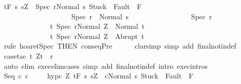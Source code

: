 \begin{isabellebody}
\ {\isachardoublequoteopen}{\isasymGamma}{\isacharcomma}{\isasymTheta}{\isasymturnstile}\isactrlsub t\isactrlbsub {\isacharslash}F\isactrlesub \ {\isacharbraceleft}s{\isachardot}\ s{\isacharequal}Z\ {\isasymand}\ {\isasymGamma}{\isasymturnstile}{\isasymlangle}Spec\ r{\isacharcomma}Normal\ s{\isasymrangle}\ {\isasymRightarrow}{\isasymnotin}{\isacharparenleft}{\isacharbraceleft}Stuck{\isacharbraceright}\ {\isasymunion}\ Fault\ {\isacharbackquote}\ {\isacharparenleft}{\isacharminus}F{\isacharparenright}{\isacharparenright}\ {\isasymand}\ \isanewline
\ \ \ \ \ \ \ \ \ \ \ \ \ \ \ \ \ \ \ \ {\isasymGamma}{\isasymturnstile}Spec\ r\ {\isasymdown}\ Normal\ s{\isacharbraceright}\ \isanewline
\ \ \ \ \ \ \ \ \ \ \ \ \ \ \ \ Spec\ r\isanewline
\ \ \ \ \ \ \ \ \ \ \ \ \ \ {\isacharbraceleft}t{\isachardot}\ {\isasymGamma}{\isasymturnstile}{\isasymlangle}Spec\ r{\isacharcomma}Normal\ Z{\isasymrangle}\ {\isasymRightarrow}\ Normal\ t{\isacharbraceright}{\isacharcomma}\isanewline
\ \ \ \ \ \ \ \ \ \ \ \ \ \ {\isacharbraceleft}t{\isachardot}\ {\isasymGamma}{\isasymturnstile}{\isasymlangle}Spec\ r{\isacharcomma}Normal\ Z{\isasymrangle}\ {\isasymRightarrow}\ Abrupt\ t{\isacharbraceright}{\isachardoublequoteclose}\isanewline
\ \ \ \ \isamarkupfalse%
\ {\isacharparenleft}rule\ hoaret{\isachardot}Spec\ {\isacharbrackleft}THEN\ conseqPre{\isacharbrackright}{\isacharparenright}\isanewline
\ \ \ \ \isamarkupfalse%
\ {\isacharparenleft}clarsimp\ simp\ add{\isacharcolon}\ final{\isacharunderscore}notin{\isacharunderscore}def{\isacharparenright}\isanewline
\ \ \ \ \isamarkupfalse%
\ {\isacharparenleft}case{\isacharunderscore}tac\ {\isachardoublequoteopen}{\isasymexists}t{\isachardot}\ {\isacharparenleft}Z{\isacharcomma}t{\isacharparenright}\ {\isasymin}\ r{\isachardoublequoteclose}{\isacharparenright}\isanewline
\ \ \ \ \isamarkupfalse%
\ {\isacharparenleft}auto\ elim{\isacharcolon}\ exec{\isacharunderscore}elim{\isacharunderscore}cases\ simp\ add{\isacharcolon}\ final{\isacharunderscore}notin{\isacharunderscore}def\ intro{\isacharcolon}\ exec{\isachardot}intros{\isacharparenright}\isanewline
\ \ \ \ \isamarkupfalse%
\isanewline
{}\isamarkupfalse%
\isanewline
\ \ \isamarkupfalse%
\ {\isacharparenleft}Seq\ c{}\ c{}{\isacharparenright}\ \isanewline
\ \ \isamarkupfalse%
\ hyp{\isacharunderscore}c{}{\isacharcolon}\ {\isachardoublequoteopen}{\isasymforall}Z{\isachardot}\ {\isasymGamma}{\isacharcomma}{\isasymTheta}{\isasymturnstile}\isactrlsub t\isactrlbsub {\isacharslash}F\isactrlesub \ {\isacharbraceleft}s{\isachardot}\ s{\isacharequal}Z\ {\isasymand}\ {\isasymGamma}{\isasymturnstile}{\isasymlangle}c{}{\isacharcomma}Normal\ s{\isasymrangle}\ {\isasymRightarrow}{\isasymnotin}{\isacharparenleft}{\isacharbraceleft}Stuck{\isacharbraceright}\ {\isasymunion}\ Fault\ {\isacharbackquote}\ {\isacharparenleft}{\isacharminus}F{\isacharparenright}{\isacharparenright}\ {\isasymand}\ \isanewline

\end{isabellebody}
